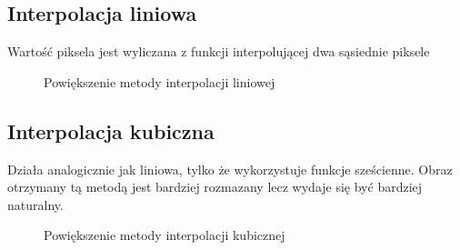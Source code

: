 \documentclass{article}
\begin{document}
    \subsection{Interpolacja liniowa}
    Wartość piksela jest wyliczana z funkcji interpolującej dwa sąsiednie piksele
    \begin{figure}[h]
        \caption{\label{fig:rungeg} Powiększenie metody interpolacji liniowej}
    \end{figure}

    \pagebreak

    \subsection{Interpolacja kubiczna}
    Działa analogicznie jak liniowa, tylko że wykorzystuje funkcje sześcienne. Obraz otrzymany tą metodą jest bardziej rozmazany lecz wydaje się być bardziej naturalny.
    \begin{figure}[h]
        \caption{\label{fig:rungeg} Powiększenie metody interpolacji kubicznej}
    \end{figure}
\end{document}
